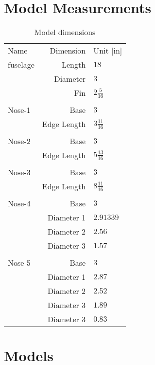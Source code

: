 \renewcommand{\theHchapter}{A\arabic{chapter}}
\appendix

\chapter{Model Measurements}
\label{app:model_measurements}
  \begin{table}
    \centering
    \begin{tabular}{lrl}
    Name & Dimension & Unit [in] \\
    fuselage & Length & $18$\\
            & Diameter &  $3$\\
            & Fin     & $2 \frac{5}{16}$\\
            \\
    Nose-1  & Base & $3$ \\
            & Edge Length & $3 \frac{11}{16}$ \\
            \\
    Nose-2  & Base & $3$ \\
            & Edge Length & $5 \frac{13}{16}$ \\
            \\
    Nose-3  & Base & $3$ \\
            & Edge Length & $8 \frac{11}{16}$ \\
            \\
    Nose-4  & Base & $3$ \\
            & Diameter 1 & $2.91339$ \\
            & Diameter 2 & $2.56$ \\
            & Diameter 3 & $1.57$ \\
            \\
    Nose-5  & Base & $3$ \\
            & Diameter 1 & $2.87$ \\
            & Diameter 2 & $2.52$ \\
            & Diameter 3 & $1.89$ \\
            & Diameter 3 & $0.83$ \\
    \end{tabular}
    \caption{Model dimensions}
    \label{tab:models}
  \end{table}

\chapter{Models}
\label{app:models}

